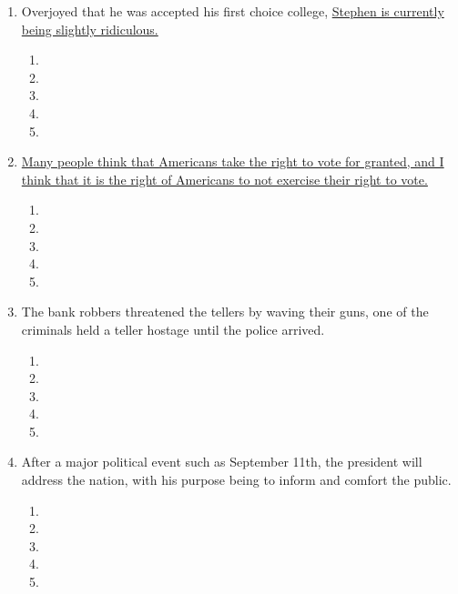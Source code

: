 \begin{enumerate}
\bigskip
\item Overjoyed that he was accepted his first choice college, \ul{Stephen is currently being slightly ridiculous.}

\bigskip
\begin{enumerate}[label=(\Alph*)]

\item        \hrulefill
\item   \hrulefill
\item    \hrulefill
\item    \hrulefill
\item   \hrulefill
\end{enumerate}

\bigskip
\item \ul{Many people think that Americans take the right to vote for granted, and I think that it is the right of Americans to not exercise their right to vote.}

\bigskip
\begin{enumerate}[label=(\Alph*)]

\item        \hrulefill
\item   \hrulefill
\item    \hrulefill
\item    \hrulefill
\item   \hrulefill
\end{enumerate}

\bigskip
\item The bank robbers threatened the tellers by waving their guns, one of the criminals held a teller hostage until the police arrived. 
\bigskip
\begin{enumerate}[label=(\Alph*)]

\item        \hrulefill
\item   \hrulefill
\item    \hrulefill
\item    \hrulefill
\item   \hrulefill
\end{enumerate}

\bigskip
\item After a major political event such as September 11th, the president will address the nation, with his purpose being to inform and comfort the public.

\bigskip
\begin{enumerate}[label=(\Alph*)]

\item        \hrulefill
\item   \hrulefill
\item    \hrulefill
\item    \hrulefill
\item   \hrulefill
\end{enumerate}


\end{enumerate}
